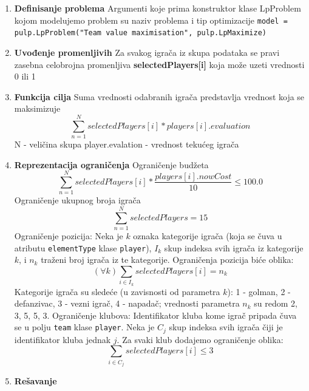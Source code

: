 \documentclass[a4paper]{article}
\begin{document}
\begin{enumerate}
  \item \textbf {Definisanje problema} \newline \newline
    Argumenti koje prima konstruktor klase LpProblem kojom modelujemo problem su naziv problema i tip optimizacije   \newline \newline
    \texttt{model = pulp.LpProblem("Team value maximisation", pulp.LpMaximize)}
  \item  \textbf{Uvođenje promenljivih} \newline \newline
  Za svakog igrača iz skupa podataka se pravi zasebna celobrojna promenljiva \textbf{selectedPlayers[i]} koja može uzeti vrednosti 0 ili 1
  \item  \textbf{Funkcija cilja} \newline \newline
  Suma vrednosti odabranih igrača predstavlja vrednost koja se maksimizuje
  \[ \sum_{n=1}^{N}selectedPlayers[i] * players[i].evaluation  \]
  N - veličina skupa \newline
  player.evalation - vrednost tekućeg igrača
  \item  \textbf{Reprezentacija ograničenja} \newline \newline
  Ograničenje budžeta
  \[ \sum_{n=1}^{N}selectedPlayers[i] * \frac{players[i].nowCost}{ 10} \leq 100.0  \] 
  Ograničenje ukupnog broja igrača
  \[ \sum_{n=1}^{N}selectedPlayers = 15  \] \newline
  Ograničenje pozicija: 
  Neka je $k$ oznaka kategorije igrača (koja se čuva u atributu \texttt{elementType} klase \texttt{player}), $I_k$ skup indeksa svih igrača iz kategorije $k$, i $n_k$ traženi broj igrača iz te kategorije.
  Ograničenja pozicija biće oblika:\newline
  \[ (\forall k) \sum_{i \in I_k}selectedPlayers[i] = n_k\]
  Kategorije igrača su sledeće (u zavisnosti od parametra $k$): 1 - golman, 2 - defanzivac, 3 - vezni igrač, 4 - napadač; vrednosti parametra $n_k$ su redom 2, 3, 5, 5, 3.
  \newline
  Ograničenje klubova: Identifikator kluba kome igrač pripada čuva se u polju \texttt{team} klase \texttt{player}. Neka je $C_j$ skup indeksa svih igrača čiji je identifikator kluba jednak $j$. Za svaki klub dodajemo ograničenje oblika:
  \[\sum_{i \in C_j}selectedPlayers[i] \leq 3\]
  \item  \textbf{Rešavanje} \newline \newline

\end{enumerate}
\end{document}
